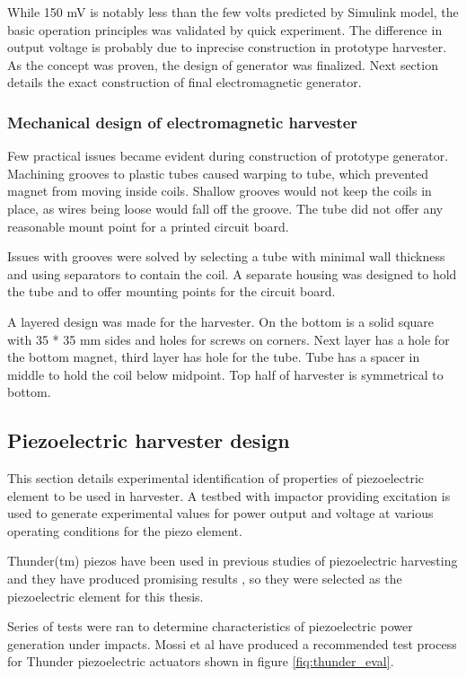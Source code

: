 While 150 mV is notably less than the few volts predicted by Simulink model, the basic operation principles was validated by quick experiment. The difference in output voltage is probably due to inprecise construction in prototype harvester. As the concept was proven, the design of generator was finalized. Next section details the exact construction of final electromagnetic generator. 

\subsubsection{Mechanical design of electromagnetic harvester}\label{sect:emh_design}
Few practical issues became evident during construction of prototype generator. Machining grooves to plastic tubes caused warping to tube, which prevented magnet from moving inside coils. Shallow grooves would not keep the coils in place, as wires being loose would fall off the groove. The tube did not offer any reasonable mount point for a printed circuit board. 

Issues with grooves were solved by selecting a tube with minimal wall thickness and using separators to contain the coil. A separate housing was designed to hold the tube and to offer mounting points for the circuit board. 

A layered design was made for the harvester. On the bottom is a solid square with 35 * 35 mm sides and holes for screws on corners. Next layer has a hole for the bottom magnet, third layer has hole for the tube. Tube has a spacer in middle to hold the coil below midpoint. Top half of harvester is symmetrical to bottom. 

\subsection{Piezoelectric harvester design}
This section details experimental identification of properties of piezoelectric element to be used in harvester. A testbed with impactor providing excitation is used to generate experimental values for power output and voltage at various operating conditions for the piezo element.

Thunder(tm) piezos have been used in previous studies of piezoelectric harvesting and they have produced promising results \cite{Manla2009}, so they were selected as the piezoelectric element for this thesis.

Series of tests were ran to determine characteristics of piezoelectric power generation under impacts. Mossi et al \cite{Mossi} have produced a recommended test process for Thunder piezoelectric actuators shown in figure \ref{fiq:thunder_eval}.

